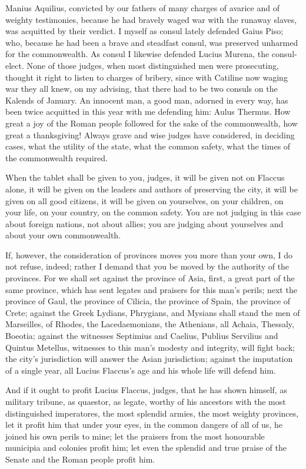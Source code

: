  Manius Aquilius, convicted by our fathers of many charges of avarice and of weighty testimonies, because he had bravely waged war with the runaway slaves, was acquitted by their verdict. I myself as consul lately defended Gaius Piso; who, because he had been a brave and steadfast consul, was preserved unharmed for the commonwealth. As consul I likewise defended Lucius Murena, the consul-elect. None of those judges, when most distinguished men were prosecuting, thought it right to listen to charges of bribery, since with Catiline now waging war they all knew, on my advising, that there had to be two consuls on the Kalends of January. An innocent man, a good man, adorned in every way, has been twice acquitted in this year with me defending him: Aulus Thermus. How great a joy of the Roman people followed for the sake of the commonwealth, how great a thanksgiving! Always grave and wise judges have considered, in deciding cases, what the utility of the state, what the common safety, what the times of the commonwealth required.

 When the tablet shall be given to you, judges, it will be given not on Flaccus alone, it will be given on the leaders and authors of preserving the city, it will be given on all good citizens, it will be given on yourselves, on your children, on your life, on your country, on the common safety. You are not judging in this case about foreign nations, not about allies; you are judging about yourselves and about your own commonwealth.

 If, however, the consideration of provinces moves you more than your own, I do not refuse, indeed; rather I demand that you be moved by the authority of the provinces. For we shall set against the province of Asia, first, a great part of the same province, which has sent legates and praisers for this man's perils; next the province of Gaul, the province of Cilicia, the province of Spain, the province of Crete; against the Greek Lydians, Phrygians, and Mysians shall stand the men of Marseilles, of Rhodes, the Lacedaemonians, the Athenians, all Achaia, Thessaly, Boeotia; against the witnesses Septimius and Caelius, Publius Servilius and Quintus Metellus, witnesses to this man's modesty and integrity, will fight back; the city's jurisdiction will answer the Asian jurisdiction; against the imputation of a single year, all Lucius Flaccus's age and his whole life will defend him.

 And if it ought to profit Lucius Flaccus, judges, that he has shown himself, as military tribune, as quaestor, as legate, worthy of his ancestors with the most distinguished imperatores, the most splendid armies, the most weighty provinces, let it profit him that under your eyes, in the common dangers of all of us, he joined his own perils to mine; let the praisers from the most honourable municipia and colonies profit him; let even the splendid and true praise of the Senate and the Roman people profit him.

